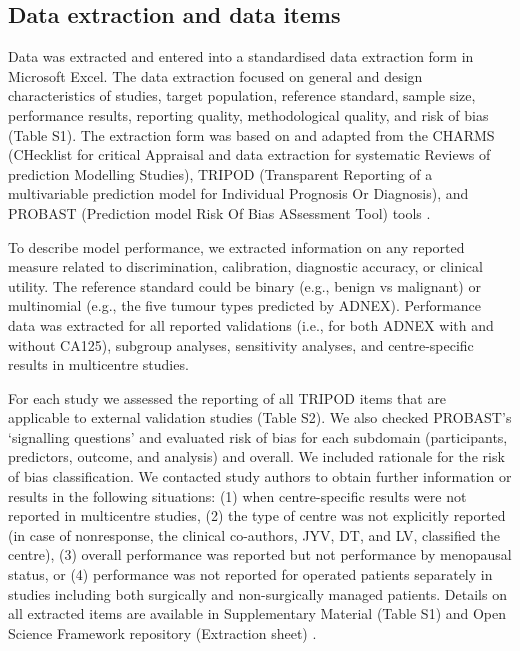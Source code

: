 \subsection{Data extraction and data items}
Data was extracted and entered into a standardised data extraction form in
Microsoft Excel. The data extraction focused on general and design
characteristics of studies, target population, reference standard, sample size,
performance results, reporting quality, methodological quality, and risk of bias
(Table S1). The extraction form was based on and adapted from the \gls{CHARMS}
(CHecklist for critical Appraisal and data extraction for systematic Reviews of
prediction Modelling Studies), \gls{TRIPOD} (Transparent Reporting of a multivariable
prediction model for Individual Prognosis Or Diagnosis), and \gls{PROBAST} (Prediction
model Risk Of Bias ASsessment Tool) tools
 \cite{wolffPROBASTToolAssess2019,
moonsCriticalAppraisalData2014,
collinsTransparentReportingMultivariable2015}.

To describe model performance, we extracted information on any reported measure
related to discrimination, calibration, diagnostic accuracy, or clinical
utility. The reference standard could be binary (e.g., benign vs malignant) or
multinomial (e.g., the five tumour types predicted by \gls{ADNEX}). Performance data
was extracted for all reported validations (i.e., for both \gls{ADNEX} with and
without CA125), subgroup analyses, sensitivity analyses, and centre-specific
results in multicentre studies.

For each study we assessed the reporting of all \gls{TRIPOD} items that are applicable
to external validation studies (Table S2). We also checked \gls{PROBAST}’s ‘signalling
questions’ and evaluated risk of bias for each subdomain (participants,
predictors, outcome, and analysis) and overall. We included rationale for the
risk of bias classification. We contacted study authors to obtain further
information or results in the following situations: (1) when centre-specific
results were not reported in multicentre studies, (2) the type of centre was not
explicitly reported (in case of nonresponse, the clinical co-authors, JYV, DT,
and LV, classified the centre), (3) overall performance was reported but not
performance by menopausal status, or (4) performance was not reported for
operated patients separately in studies including both surgically and
non-surgically managed patients. Details on all extracted items are available in
Supplementary Material (Table S1) and Open Science Framework repository
(Extraction sheet) \cite{barrenadaADNEXRiskModel2025}.


